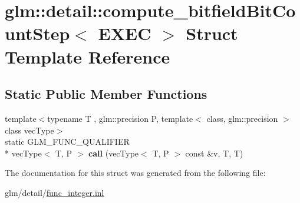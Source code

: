 \hypertarget{structglm_1_1detail_1_1compute__bitfieldBitCountStep}{\section{glm\-:\-:detail\-:\-:compute\-\_\-bitfield\-Bit\-Count\-Step$<$ E\-X\-E\-C $>$ Struct Template Reference}
\label{structglm_1_1detail_1_1compute__bitfieldBitCountStep}
}
\subsection*{Static Public Member Functions}
\begin{DoxyCompactItemize}
\item 
\hypertarget{structglm_1_1detail_1_1compute__bitfieldBitCountStep_a138fcd5732e6cda3d8c6cc093e7f7f0f}{{\footnotesize template$<$typename T , glm\-::precision P, template$<$ class, glm\-::precision $>$ class vec\-Type$>$ }\\static G\-L\-M\-\_\-\-F\-U\-N\-C\-\_\-\-Q\-U\-A\-L\-I\-F\-I\-E\-R \\*
vec\-Type$<$ T, P $>$ {\bfseries call} (vec\-Type$<$ T, P $>$ const \&v, T, T)}\label{structglm_1_1detail_1_1compute__bitfieldBitCountStep_a138fcd5732e6cda3d8c6cc093e7f7f0f}

\end{DoxyCompactItemize}


The documentation for this struct was generated from the following file\-:\begin{DoxyCompactItemize}
\item 
glm/detail/\hyperlink{func__integer_8inl}{func\-\_\-integer.\-inl}\end{DoxyCompactItemize}
